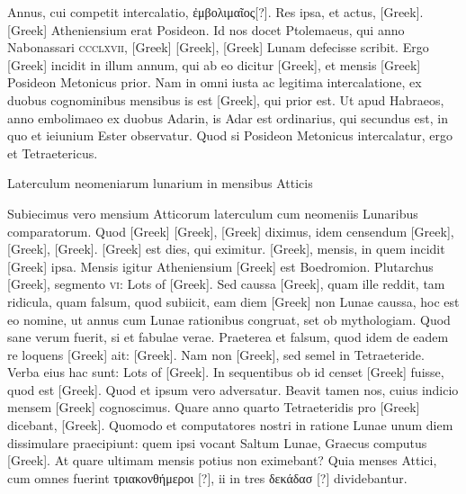 Annus, cui competit intercalatio, \textgreek{ἐμβολιμαῖος[?]}.
Res ipsa, et
actus, \textgreek{[Greek]}.
\textgreek{[Greek]} Atheniensium erat Posideon.
Id nos
docet Ptolemaeus, qui anno Nabonassari \textsc{ccclxvii}, \textgreek{[Greek]}
\textgreek{[Greek]}, \textgreek{[Greek]} Lunam defecisse scribit.
Ergo \textgreek{[Greek]} incidit in illum annum, qui ab eo dicitur
 \textgreek{[Greek]}, et mensis \textgreek{[Greek]} Posideon Metonicus prior.
Nam in omni
iusta ac legitima intercalatione, ex duobus
cognominibus mensibus is est \textgreek{[Greek]},
qui prior est.
Ut apud Habraeos, anno
embolimaeo ex duobus Adarin, is Adar
est ordinarius, qui secundus est, in quo et
ieiunium Ester observatur.
Quod si Posideon
Metonicus intercalatur, ergo et Tetraetericus.
\begin{table}[htbp]
\centering

\caption{Laterculum neomeniarum lunarium in mensibus Atticis}
\label{tab:neomeniarum_lunarium}
\end{table}
Subiecimus vero mensium Atticorum
laterculum cum neomeniis Lunaribus
comparatorum.
Quod \textgreek{[Greek]}
\textgreek{[Greek]}, \textgreek{[Greek]} diximus,
idem censendum \textgreek{[Greek]}, \textgreek{[Greek]},
\textgreek{[Greek]}.
\textgreek{[Greek]} est dies, qui eximitur.
\textgreek{[Greek]}, mensis, in quem incidit
 \textgreek{[Greek]} ipsa.
Mensis igitur Atheniensium
\textgreek{[Greek]} est Boedromion.
Plutarchus \textgreek{[Greek]}, segmento
\textsc{vi}: \textgreek{Lots of [Greek]}.
Sed caussa
\textgreek{[Greek]}, quam ille reddit, tam ridicula, quam falsum,
 quod subiicit,
eam diem \textgreek{[Greek]} non Lunae caussa, hoc est eo nomine, ut
annus cum Lunae rationibus congruat, set ob mythologiam.
Quod
sane verum fuerit, si et fabulae verae.
Praeterea et falsum, quod idem
de eadem re loquens \textgreek{[Greek]} ait: \textgreek{[Greek]}.
Nam non \textgreek{[Greek]}, sed semel in Tetraeteride.
Verba eius
hac sunt: \textgreek{Lots of [Greek]}.
In sequentibus ob id censet \textgreek{[Greek]} fuisse,
 quod est \textgreek{[Greek]}.
Quod et ipsum vero adversatur.
Beavit tamen nos, cuius
indicio mensem \textgreek{[Greek]} cognoscimus.
Quare anno quarto
Tetraeteridis pro \textgreek{[Greek]} dicebant, \textgreek{[Greek]}.
Quomodo
et computatores nostri in ratione Lunae unum diem dissimulare
praecipiunt: quem ipsi vocant Saltum Lunae,
 Graecus computus \textgreek{[Greek]}.
At quare ultimam mensis potius non eximebant?
Quia
menses Attici, cum omnes fuerint \textgreek{τριακονθήμεροι [?]},
 ii in tres \textgreek{δεκάδασ [?]} dividebantur.

